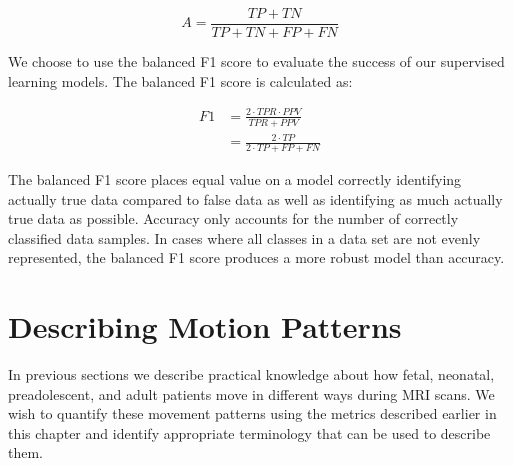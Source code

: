 \begin{equation}
A = \frac{TP+TN}{TP+TN+FP+FN}
\end{equation}

We choose to use the balanced F1 score to evaluate the success of our supervised learning models. The balanced F1 score is calculated as:

\begin{equation}
\begin{split}
F1 & = \frac{2 \cdot TPR \cdot PPV}{TPR+PPV} \\
& = \frac{2 \cdot TP}{2 \cdot TP + FP + FN}
\end{split}
\end{equation}

The balanced F1 score places equal value on a model correctly identifying actually true data compared to false data as well as identifying as much actually true data as possible. Accuracy only accounts for the number of correctly classified data samples. In cases where all classes in a data set are not evenly represented, the balanced F1 score produces a more robust model than accuracy. 


\section{Describing Motion Patterns}

In previous sections we describe practical knowledge about how fetal, neonatal, preadolescent, and adult patients move in different ways during MRI scans. We wish to quantify these movement patterns using the metrics described earlier in this chapter and identify appropriate terminology that can be used to describe them.





